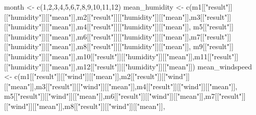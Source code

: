 \documentclass[
]{article}
\newenvironment{Shaded}{\begin{snugshade}}{\end{snugshade}}
\newcommand{\DecValTok}[1]{\textcolor[rgb]{0.00,0.00,0.81}{#1}}
\newcommand{\FunctionTok}[1]{\textcolor[rgb]{0.00,0.00,0.00}{#1}}
\newcommand{\NormalTok}[1]{#1}
\newcommand{\OtherTok}[1]{\textcolor[rgb]{0.56,0.35,0.01}{#1}}
\newcommand{\StringTok}[1]{\textcolor[rgb]{0.31,0.60,0.02}{#1}}
\begin{document}
\begin{Shaded}
\begin{Highlighting}[]
\NormalTok{month }\OtherTok{\textless{}{-}} \FunctionTok{c}\NormalTok{(}\DecValTok{1}\NormalTok{,}\DecValTok{2}\NormalTok{,}\DecValTok{3}\NormalTok{,}\DecValTok{4}\NormalTok{,}\DecValTok{5}\NormalTok{,}\DecValTok{6}\NormalTok{,}\DecValTok{7}\NormalTok{,}\DecValTok{8}\NormalTok{,}\DecValTok{9}\NormalTok{,}\DecValTok{10}\NormalTok{,}\DecValTok{11}\NormalTok{,}\DecValTok{12}\NormalTok{)}
\NormalTok{mean\_humidity }\OtherTok{\textless{}{-}} \FunctionTok{c}\NormalTok{(m1[[}\StringTok{"result"}\NormalTok{]][[}\StringTok{"humidity"}\NormalTok{]][[}\StringTok{"mean"}\NormalTok{]],m2[[}\StringTok{"result"}\NormalTok{]][[}\StringTok{"humidity"}\NormalTok{]][[}\StringTok{"mean"}\NormalTok{]],m3[[}\StringTok{"result"}\NormalTok{]][[}\StringTok{"humidity"}\NormalTok{]][[}\StringTok{"mean"}\NormalTok{]],m4[[}\StringTok{"result"}\NormalTok{]][[}\StringTok{"humidity"}\NormalTok{]][[}\StringTok{"mean"}\NormalTok{]],}
\NormalTok{                   m5[[}\StringTok{"result"}\NormalTok{]][[}\StringTok{"humidity"}\NormalTok{]][[}\StringTok{"mean"}\NormalTok{]],m6[[}\StringTok{"result"}\NormalTok{]][[}\StringTok{"humidity"}\NormalTok{]][[}\StringTok{"mean"}\NormalTok{]],m7[[}\StringTok{"result"}\NormalTok{]][[}\StringTok{"humidity"}\NormalTok{]][[}\StringTok{"mean"}\NormalTok{]],m8[[}\StringTok{"result"}\NormalTok{]][[}\StringTok{"humidity"}\NormalTok{]][[}\StringTok{"mean"}\NormalTok{]],}
\NormalTok{                   m9[[}\StringTok{"result"}\NormalTok{]][[}\StringTok{"humidity"}\NormalTok{]][[}\StringTok{"mean"}\NormalTok{]],m10[[}\StringTok{"result"}\NormalTok{]][[}\StringTok{"humidity"}\NormalTok{]][[}\StringTok{"mean"}\NormalTok{]],m11[[}\StringTok{"result"}\NormalTok{]][[}\StringTok{"humidity"}\NormalTok{]][[}\StringTok{"mean"}\NormalTok{]],m12[[}\StringTok{"result"}\NormalTok{]][[}\StringTok{"humidity"}\NormalTok{]][[}\StringTok{"mean"}\NormalTok{]])}
\NormalTok{mean\_windspeed }\OtherTok{\textless{}{-}} \FunctionTok{c}\NormalTok{(m1[[}\StringTok{"result"}\NormalTok{]][[}\StringTok{"wind"}\NormalTok{]][[}\StringTok{"mean"}\NormalTok{]],m2[[}\StringTok{"result"}\NormalTok{]][[}\StringTok{"wind"}\NormalTok{]][[}\StringTok{"mean"}\NormalTok{]],m3[[}\StringTok{"result"}\NormalTok{]][[}\StringTok{"wind"}\NormalTok{]][[}\StringTok{"mean"}\NormalTok{]],m4[[}\StringTok{"result"}\NormalTok{]][[}\StringTok{"wind"}\NormalTok{]][[}\StringTok{"mean"}\NormalTok{]],}
\NormalTok{                   m5[[}\StringTok{"result"}\NormalTok{]][[}\StringTok{"wind"}\NormalTok{]][[}\StringTok{"mean"}\NormalTok{]],m6[[}\StringTok{"result"}\NormalTok{]][[}\StringTok{"wind"}\NormalTok{]][[}\StringTok{"mean"}\NormalTok{]],m7[[}\StringTok{"result"}\NormalTok{]][[}\StringTok{"wind"}\NormalTok{]][[}\StringTok{"mean"}\NormalTok{]],m8[[}\StringTok{"result"}\NormalTok{]][[}\StringTok{"wind"}\NormalTok{]][[}\StringTok{"mean"}\NormalTok{]],}

\end{Highlighting}
\end{Shaded}
\end{document}
